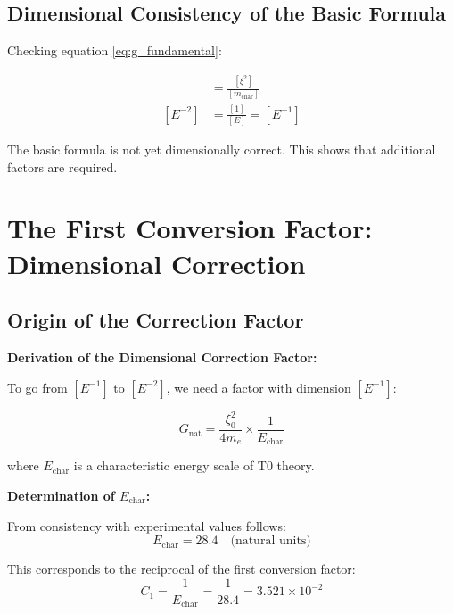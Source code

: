 \documentclass[12pt,a4paper]{article}
\begin{document}
	\subsection{Dimensional Consistency of the Basic Formula}
	
	Checking equation \eqref{eq:g_fundamental}:
	
	\begin{align}
		[G] &= \frac{[\xi^2]}{[m_{\text{char}}]} \\
		[E^{-2}] &= \frac{[1]}{[E]} = [E^{-1}]
	\end{align}
	
	The basic formula is not yet dimensionally correct. This shows that additional factors are required.
	
	\section{The First Conversion Factor: Dimensional Correction}
	
	\subsection{Origin of the Correction Factor}
	
	\begin{derivation}
		\textbf{Derivation of the Dimensional Correction Factor:}
		
		To go from $[E^{-1}]$ to $[E^{-2}]$, we need a factor with dimension $[E^{-1}]$:
		
		\begin{equation}
			G_{\text{nat}} = \frac{\xi_0^2}{4 m_e} \times \frac{1}{E_{\text{char}}}
		\end{equation}
		
		where $E_{\text{char}}$ is a characteristic energy scale of T0 theory.
		
		\textbf{Determination of $E_{\text{char}}$:}
		
		From consistency with experimental values follows:
		\begin{equation}
			E_{\text{char}} = 28.4 \quad \text{(natural units)}
		\end{equation}
		
		This corresponds to the reciprocal of the first conversion factor:
		\begin{equation}
			C_1 = \frac{1}{E_{\text{char}}} = \frac{1}{28.4} = 3.521 \times 10^{-2}
		\end{equation}
	\end{derivation}
	
\end{document}
